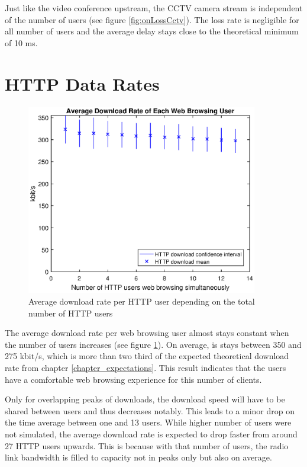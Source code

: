\documentclass[a4paper,10pt]{book}\usepackage{graphicx}
\begin{document}
Just like the video conference upstream, the CCTV camera stream is independent of the number of users (see figure \ref{fig:onLossCctv}). The loss rate is negligible for all number of users and the average delay stays close to the theoretical minimum of 10 ms.

\section{HTTP Data Rates}
\begin{figure}[!ht]
  \begin{center}
    \includegraphics[width=0.9\textwidth]{on_http_download.eps}
    \caption{Average download rate per HTTP user depending on the total number of HTTP users}
    \label{fig:onHttpDownload}
    \end{center}
\end{figure}

The average download rate per web browsing user almost stays constant when the number of users increases (see figure \ref{fig:onHttpDownload}). On average, is stays between 350 and 275 kbit/s, which is more than two third of the expected theoretical download rate from chapter \ref{chapter_expectations}. This result indicates that the users have a comfortable web browsing experience for this number of clients. 

Only for overlapping peaks of downloads, the download speed will have to be shared between users and thus decreases notably. This leads to a minor drop on the time average between one and 13 users. While higher number of users were not simulated, the average download rate is expected to drop faster from around 27 HTTP users upwards. This is because with that number of users, the radio link bandwidth is filled to capacity not in peaks only but also on average.
\end{document}
